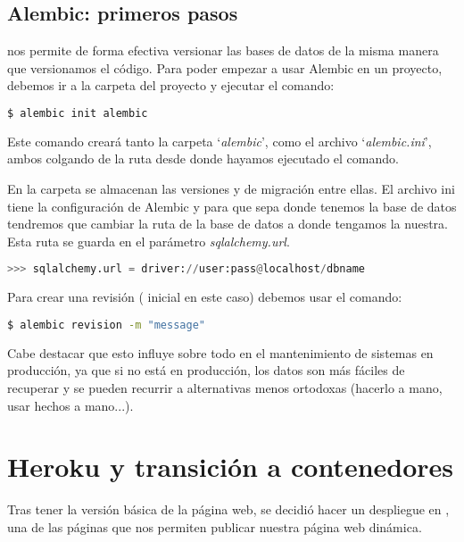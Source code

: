 \subsection{Alembic: primeros pasos}

 nos permite de forma efectiva versionar las bases de datos de la misma manera que versionamos el código. Para poder empezar a usar Alembic en un proyecto, debemos ir a la carpeta del proyecto y ejecutar el comando:

\begin{lstlisting}[language=bash, frame=single]
  $ alembic init alembic
\end{lstlisting}

Este comando creará tanto la carpeta `\emph{alembic}', como el archivo `\emph{alembic.ini}', ambos colgando de la ruta desde donde hayamos ejecutado el comando. 

En la carpeta se almacenan las versiones y  de migración entre ellas. El archivo ini tiene la configuración de Alembic y para que sepa donde tenemos la base de datos tendremos que cambiar la ruta de la base de datos a donde tengamos la nuestra. Esta ruta se guarda en el parámetro \emph{sqlalchemy.url}.

\begin{lstlisting}[language=python, frame=single]
  >>> sqlalchemy.url = driver://user:pass@localhost/dbname
\end{lstlisting}



Para crear una revisión ( inicial en este caso) debemos usar el comando:

\begin{lstlisting}[language=bash, frame=single]
  $ alembic revision -m "message"
\end{lstlisting}

Cabe destacar que esto influye sobre todo en el mantenimiento de sistemas en producción, ya que si no está en producción, los datos son más fáciles de recuperar y se pueden recurrir a alternativas menos ortodoxas (hacerlo a mano, usar  hechos a mano...).



\section{Heroku y transición a contenedores}

Tras tener la versión básica de la página web, se decidió hacer un despliegue en , una de las páginas que nos permiten publicar nuestra página web dinámica. 

